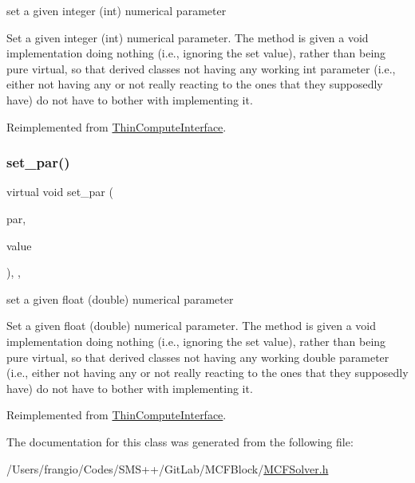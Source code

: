 set a given integer (int) numerical parameter 

Set a given integer (int) numerical parameter. The method is given a void implementation doing nothing (i.\+e., ignoring the set value), rather than being pure virtual, so that derived classes not having any working int parameter (i.\+e., either not having any or not really reacting to the ones that they supposedly have) do not have to bother with implementing it. 

Reimplemented from \mbox{\hyperlink{class_s_m_spp__di__unipi__it_1_1_thin_compute_interface_a73669f587bb938b587c54ad7e73ec297}{Thin\+Compute\+Interface}}.

\mbox{\label{class_s_m_spp__di__unipi__it_1_1_m_c_f_solver_a341557f3dd81bff0f060dbe41a4ba325}} 
\subsubsection{\texorpdfstring{set\+\_\+par()}{set\_par()}\hspace{0.1cm}{\footnotesize\ttfamily [2/2]}}
{\footnotesize\ttfamily virtual void set\+\_\+par (\begin{DoxyParamCaption}\item[{const \mbox{\hyperlink{class_s_m_spp__di__unipi__it_1_1_thin_compute_interface_aa3d710629ad8c434286726ad810c3b47}{idx\+\_\+type}}}]{par,  }\item[{const double}]{value }\end{DoxyParamCaption})\hspace{0.3cm}{\ttfamily [inline]}, {\ttfamily [override]}, {\ttfamily [virtual]}}



set a given float (double) numerical parameter 

Set a given float (double) numerical parameter. The method is given a void implementation doing nothing (i.\+e., ignoring the set value), rather than being pure virtual, so that derived classes not having any working double parameter (i.\+e., either not having any or not really reacting to the ones that they supposedly have) do not have to bother with implementing it. 

Reimplemented from \mbox{\hyperlink{class_s_m_spp__di__unipi__it_1_1_thin_compute_interface_a602be88195984f4f1b5dff7995976530}{Thin\+Compute\+Interface}}.



The documentation for this class was generated from the following file\+:\begin{DoxyCompactItemize}
\item 
/\+Users/frangio/\+Codes/\+S\+M\+S++/\+Git\+Lab/\+M\+C\+F\+Block/\mbox{\hyperlink{_m_c_f_solver_8h}{M\+C\+F\+Solver.\+h}}\end{DoxyCompactItemize}
